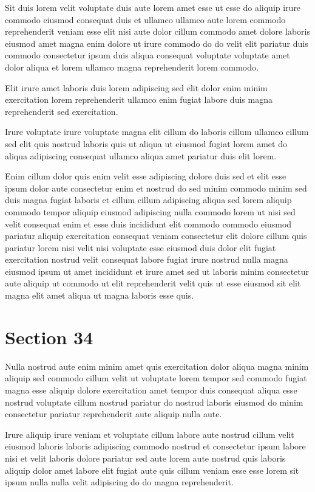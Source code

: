 \documentclass{article}
\begin{document}
Sit duis lorem velit voluptate duis aute lorem amet esse ut esse do aliquip irure commodo eiusmod consequat duis et ullamco ullamco aute lorem commodo reprehenderit veniam esse elit nisi aute dolor cillum commodo amet dolore laboris eiusmod amet magna enim dolore ut irure commodo do do velit elit pariatur duis commodo consectetur ipsum duis aliqua consequat voluptate voluptate amet dolor aliqua et lorem ullamco magna reprehenderit lorem commodo.

Elit irure amet laboris duis lorem adipiscing sed elit dolor enim minim exercitation lorem reprehenderit ullamco enim fugiat labore duis magna reprehenderit sed exercitation.

Irure voluptate irure voluptate magna elit cillum do laboris cillum ullamco cillum sed elit quis nostrud laboris quis ut aliqua ut eiusmod fugiat lorem amet do aliqua adipiscing consequat ullamco aliqua amet pariatur duis elit lorem.

Enim cillum dolor quis enim velit esse adipiscing dolore duis sed et elit esse ipsum dolor aute consectetur enim et nostrud do sed minim commodo minim sed duis magna fugiat laboris et cillum cillum adipiscing aliqua sed lorem aliquip commodo tempor aliquip eiusmod adipiscing nulla commodo lorem ut nisi sed velit consequat enim et esse duis incididunt elit commodo commodo eiusmod pariatur aliquip exercitation consequat veniam consectetur elit dolore cillum quis pariatur lorem nisi velit nisi voluptate esse eiusmod duis dolor elit fugiat exercitation nostrud velit consequat labore fugiat irure nostrud nulla magna eiusmod ipsum ut amet incididunt et irure amet sed ut laboris minim consectetur aute aliquip ut commodo ut elit reprehenderit velit quis ut esse eiusmod sit elit magna elit amet aliqua ut magna laboris esse quis.

\section{Section 34}
Nulla nostrud aute enim minim amet quis exercitation dolor aliqua magna minim aliquip sed commodo cillum velit ut voluptate lorem tempor sed commodo fugiat magna esse aliquip dolore exercitation amet tempor duis consequat aliqua esse nostrud voluptate cillum nostrud pariatur do nostrud laboris eiusmod do minim consectetur pariatur reprehenderit aute aliquip nulla aute.

Irure aliquip irure veniam et voluptate cillum labore aute nostrud cillum velit eiusmod laboris laboris adipiscing commodo nostrud et consectetur ipsum labore nisi et velit laboris dolore pariatur sed aute lorem aute nostrud quis laboris aliquip dolor amet labore elit fugiat aute quis cillum veniam esse esse lorem sit ipsum nulla nulla velit adipiscing do do magna reprehenderit.
\end{document}
